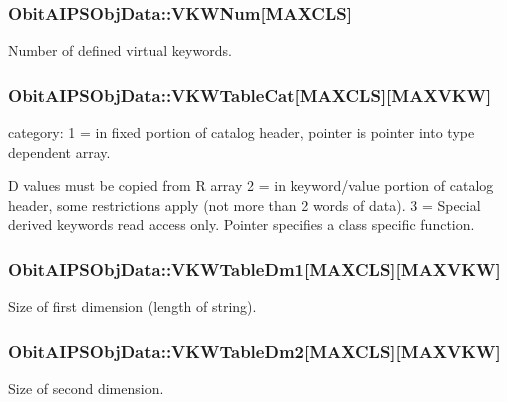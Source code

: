 \subsubsection{ {\bf Obit\-AIPSObj\-Data::VKWNum}[MAXCLS]}\label{structObitAIPSObjData_o1}


Number of defined virtual keywords. 

\subsubsection{ {\bf Obit\-AIPSObj\-Data::VKWTable\-Cat}[MAXCLS][MAXVKW]}\label{structObitAIPSObjData_o3}


category: 1 = in fixed portion of catalog header, pointer is pointer into type dependent array. 

D values must be copied from R array 2 = in keyword/value portion of catalog header, some restrictions apply (not more than 2 words of data). 3 = Special derived keywords read access only. Pointer specifies a class specific function. 
\subsubsection{ {\bf Obit\-AIPSObj\-Data::VKWTable\-Dm1}[MAXCLS][MAXVKW]}\label{structObitAIPSObjData_o6}


Size of first dimension (length of string). 

\subsubsection{ {\bf Obit\-AIPSObj\-Data::VKWTable\-Dm2}[MAXCLS][MAXVKW]}\label{structObitAIPSObjData_o7}


Size of second dimension. 

